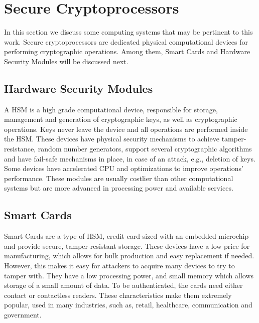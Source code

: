 \section{Secure Cryptoprocessors}\label{chap:background:cryptoprocessors}

In this section we discuss some computing systems that may be pertinent to this work. 
Secure cryptoprocessors are dedicated physical computational devices for performing cryptographic operations. Among them, Smart Cards and Hardware Security Modules will be discussed next.

\subsection*{Hardware Security Modules}\label{chap:background:computing:hsm}

A \ac{HSM} is a high grade computational device, responsible for storage, management and generation of cryptographic keys, as well as cryptographic operations. Keys never leave the device and all operations are performed inside the \ac{HSM}. These devices have physical security mechanisms to achieve tamper-resistance, random number generators, support several cryptographic algorithms and have fail-safe mechanisms in place, in case of an attack, e.g., deletion of keys. Some devices have accelerated \ac{CPU} and optimizations to improve operations' performance.
These modules are usually costlier than other computational systems but are more advanced in processing power and available services.

\subsection*{Smart Cards}\label{chap:background:computing:smartcards}
Smart Cards are a type of \ac{HSM}, credit card-sized with an embedded microchip and provide secure, tamper-resistant storage. These devices have a low price for manufacturing, which allows for bulk production and easy replacement if needed. However, this makes it easy for attackers to acquire many devices to try to tamper with. They have a low processing power, and small memory which allows storage of a small amount of data. To be authenticated, the cards need either contact or contactless readers. These characteristics make them extremely popular, used in many industries, such as, retail, healthcare, communication and government.

